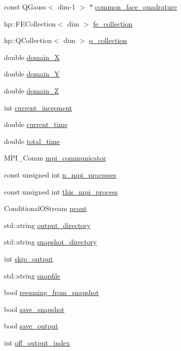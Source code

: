 \begin{DoxyCompactItemize}
\item 
const Q\-Gauss$<$ dim-\/1 $>$ $\ast$ \hyperlink{classmechano_chem_f_e_m_af302403bba9078de92d05b4cbe6f44dd}{common\-\_\-face\-\_\-quadrature}
\item 
hp\-::\-F\-E\-Collection$<$ dim $>$ \hyperlink{classmechano_chem_f_e_m_a02ae472de2833f8763bfe10520be87db}{fe\-\_\-collection}
\item 
hp\-::\-Q\-Collection$<$ dim $>$ \hyperlink{classmechano_chem_f_e_m_a748ffdb78a6294cd525fe5979bb30649}{q\-\_\-collection}
\item 
double \hyperlink{classmechano_chem_f_e_m_a9db8ce20b0de349987441b8d6830c97a}{domain\-\_\-\-X}
\item 
double \hyperlink{classmechano_chem_f_e_m_ae7a91557a809cfab5c3dee32ae1de8cb}{domain\-\_\-\-Y}
\item 
double \hyperlink{classmechano_chem_f_e_m_a199da42cf8a8e51eaeb5cacfdef1c37e}{domain\-\_\-\-Z}
\item 
int \hyperlink{classmechano_chem_f_e_m_a9a75da991ed1d29646660b1d16a0418f}{current\-\_\-increment}
\item 
double \hyperlink{classmechano_chem_f_e_m_a557717b333342f1e34a905d6162ce493}{current\-\_\-time}
\item 
double \hyperlink{classmechano_chem_f_e_m_abc276e47b85df9dd59f248e663b3b971}{total\-\_\-time}
\item 
M\-P\-I\-\_\-\-Comm \hyperlink{classmechano_chem_f_e_m_a03728ed636ca889ae407c84d181bc611}{mpi\-\_\-communicator}
\item 
const unsigned int \hyperlink{classmechano_chem_f_e_m_a7320777b83fedaf7a54cdb2fb0ef02e4}{n\-\_\-mpi\-\_\-processes}
\item 
const unsigned int \hyperlink{classmechano_chem_f_e_m_a6c34addfd3b89faf0a7b4e3fe1236fb0}{this\-\_\-mpi\-\_\-process}
\item 
Conditional\-O\-Stream \hyperlink{classmechano_chem_f_e_m_a914f651bc9ca2e223b243695dd37ba53}{pcout}
\item 
std\-::string \hyperlink{classmechano_chem_f_e_m_a95f0e6f488a1faae487cab4198842ebe}{output\-\_\-directory}
\item 
std\-::string \hyperlink{classmechano_chem_f_e_m_af7ed49a5ea9a6407acb26c5a729d4bd0}{snapshot\-\_\-directory}
\item 
int \hyperlink{classmechano_chem_f_e_m_a5413329bd1d73152f051cc8d11134f60}{skip\-\_\-output}
\item 
std\-::string \hyperlink{classmechano_chem_f_e_m_a3ce0cf43eef10e4757e8a225e9b98e96}{snapfile}
\item 
bool \hyperlink{classmechano_chem_f_e_m_a34ea26077a33f792a9468a4d0ac2feaf}{resuming\-\_\-from\-\_\-snapshot}
\item 
bool \hyperlink{classmechano_chem_f_e_m_ade455df689de2bc3fb79e1f468fd5404}{save\-\_\-snapshot}
\item 
bool \hyperlink{classmechano_chem_f_e_m_a883c18cdb18f3c36a226a7cf83e6bae0}{save\-\_\-output}
\item 
int \hyperlink{classmechano_chem_f_e_m_a5b4ed019aaae8f2992f9418a93cd1dbb}{off\-\_\-output\-\_\-index}
\end{DoxyCompactItemize}


